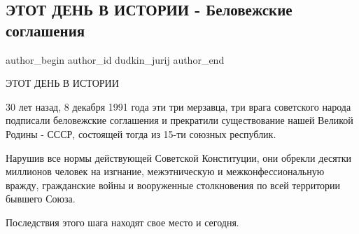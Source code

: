  
 
 
 
 
 
\subsection{ЭТОТ ДЕНЬ В ИСТОРИИ - Беловежские соглашения}
\label{sec:08_12_2021.fb.dudkin_jurij.1.belovezh_soglashenia}
 
\ifcmt
 author_begin
   author_id dudkin_jurij
 author_end
\fi

ЭТОТ ДЕНЬ В ИСТОРИИ


30 лет назад, 8 декабря 1991 года эти три  мерзавца, три врага советского
народа подписали беловежские соглашения и прекратили существование нашей
Великой Родины - СССР, состоящей тогда из 15-ти союзных республик. 

Нарушив все нормы действующей Советской Конституции, они обрекли десятки
миллионов человек на изгнание, межэтническую и межконфессиональную  вражду,
гражданские войны и вооруженные столкновения по всей территории бывшего Союза.

Последствия этого шага находят свое место и сегодня.

